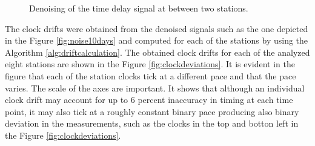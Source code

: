 \documentclass[12pt, sumlimits, intlimits]{article}
\begin{document}
\begin{figure}[ht] 
	\centering 
	\caption{Denoising of the time delay signal at between two stations.}
	\label{fig:denoising}
\end{figure}

The clock drifts were obtained from the denoised signals such as the one depicted in the Figure \ref{fig:noise10days} and computed for each of the stations by using the Algorithm \ref{alg:driftcalculation}. The obtained clock drifts for each of the analyzed eight stations are shown in the Figure \ref{fig:clockdeviations}. It is evident in the figure that each of the station clocks tick at a different pace and that the pace varies. The scale of the axes are important. It shows that although an individual clock drift may account for up to 6 percent inaccuracy in timing at each time point, it may also tick at a roughly constant binary pace producing also binary deviation in the measurements, such as the clocks in the top and botton left in the Figure \ref{fig:clockdeviations}. 
\end{document}
